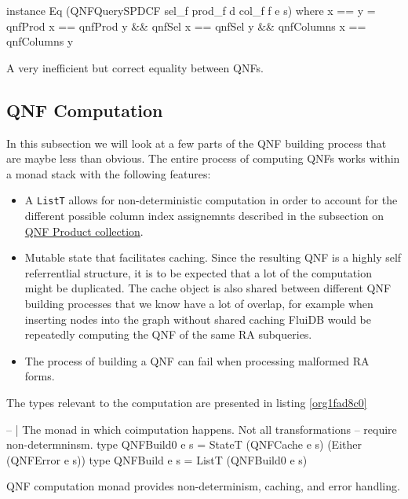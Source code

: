 \begin{listing}[p]
  \begin{haskell}
    instance Eq (QNFQuerySPDCF sel_f prod_f d col_f f e s) where
    x == y = qnfProd x == qnfProd y
    && qnfSel x == qnfSel y
    && qnfColumns x == qnfColumns y
  \end{haskell}
  \caption{\label{org4097f67}A very inefficient but correct equality between QNFs.}
\end{listing}




\subsection{QNF Computation}
\label{sec:org3f1036f}
In this subsection we will look at a few parts of the QNF building
process that are maybe less than obvious. The entire process of
computing QNFs works within a monad stack with the following features:

\begin{itemize}
\item A \texttt{ListT} allows for non-deterministic computation in order to
  account for the different possible column index assignemnts
  described in the subsection on \hyperref[sec:org86e5e2d]{QNF Product collection}.
\item Mutable state that facilitates caching. Since the resulting QNF is a
  highly self referrentlial structure, it is to be expected that a lot
  of the computation might be duplicated. The cache object is also
  shared between different QNF building processes that we know have a
  lot of overlap, for example when inserting nodes into the graph
  without shared caching FluiDB would be repeatedly computing the QNF
  of the same RA subqueries.
\item The process of building a QNF can fail when processing malformed RA
  forms.
\end{itemize}

The types relevant to the computation are presented in listing
\ref{org1fad8c0}

\begin{listing}[p]
  \begin{haskell}
    -- | The monad in which coimputation happens. Not all transformations
    -- require non-determninsm.
    type QNFBuild0 e s = StateT (QNFCache e s) (Either (QNFError e s))
    type QNFBuild e s = ListT (QNFBuild0 e s)
  \end{haskell}
  \caption{\label{org1fad8c0}QNF computation monad provides non-determinism, caching, and error handling.}
\end{listing}

